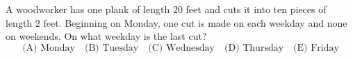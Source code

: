 A woodworker has one plank of length $20$ feet and cuts it into ten pieces of length $2$ feet. Beginning on Monday, one cut is made on each weekday and none on weekends. On what weekday is the last cut?
\[
\text{(A) Monday}\quad\text{(B) Tuesday}\quad\text{(C) Wednesday}\quad
\text{(D) Thursday}\quad\text{(E) Friday}
\]
